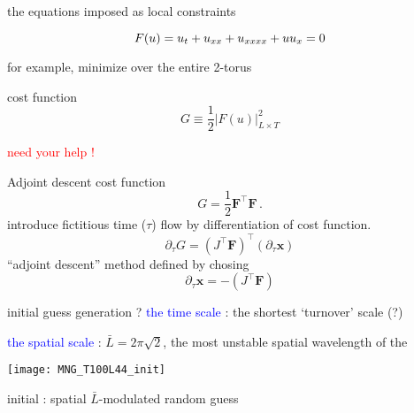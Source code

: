 \begin{frame}{the equations imposed as local constraints}
\begin{block}{\KSe}
\[
F(u) = u_t + u_{x x} + u_{x x x x} + u u_{x} = 0
\]
\end{block}
\bigskip\bigskip
for example, minimize over the entire 2-torus
\begin{block}{cost function}
\[
G \equiv \frac{1}{2} |F(u)|^2_{L \times T}
\]
\end{block}
\vfill\hfill\textcolor{red}{\Huge need your help !}
\end{frame}

\begin{frame}{Adjoint descent}
cost function
\[
  G = \frac{1}{2} \mathbf{F}^{\top}\mathbf{F}
  \,.
\]
introduce fictitious time ($\tau$) flow by differentiation of cost function.
\[
  \partial_{\tau}G = (J^{\top}\mathbf{F})^{\top}(\partial_{\tau}\mathbf{x})
\]
  ``adjoint descent'' method defined by chosing
\[
  \partial_{\tau}\mathbf{x} = -(J^{\top}\mathbf{F})
\]

\end{frame}

\begin{frame}{initial guess generation ?}
 \textcolor{blue}{the time scale} : the shortest
`turnover' scale (?)

\bigskip

\textcolor{blue}{the spatial scale} :
$\bar{L}=2\pi\sqrt{2}$, the  most unstable spatial wavelength of the \KS

\bigskip

\begin{minipage}[height=.32\textheight]{.30\textwidth}
\texttt{[image: MNG\_T100L44\_init]}
\end{minipage}

\medskip
initial : spatial $\bar{L}$-modulated random guess

\end{frame}

